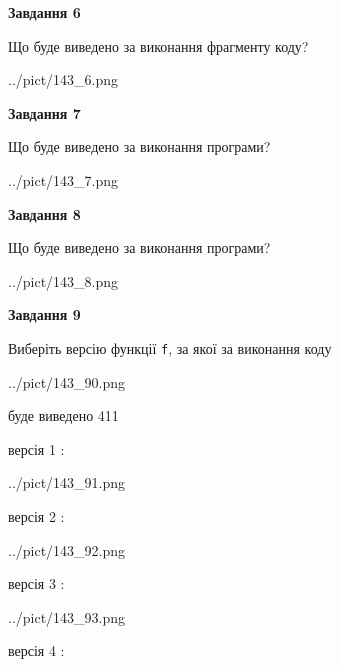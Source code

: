 \documentclass[12pt, ukrainian]{article}
\def\code#1{\Verb!#1!}
\begin{document}
{\begin {large}
{\begin {center}\textbf{Завдання 6}\end {center}}

Що буде виведено за виконання фрагменту коду?\par
\begin{center}
	{../pict/143_6.png}
\end{center}
\newpage

{\begin {center}\textbf{Завдання 7}\end {center}}

Що буде виведено за виконання програми?\par
\begin{center}
	{../pict/143_7.png}
\end{center}
\newpage

{\begin {center}\textbf{Завдання 8}\end {center}}

Що буде виведено за виконання програми?\par
\begin{center}
	{../pict/143_8.png}
\end{center}
\newpage

{\begin {center}\textbf{Завдання 9}\end {center}}

Виберіть версію функції \code{f}, за якої за виконання коду
\begin{center}
	{../pict/143_90.png}
\end{center}
буде виведено 411

\vspace{5mm}
версія 1 :

\begin{center}
	{../pict/143_91.png}
\end{center}
версія 2 :

\begin{center}
	{../pict/143_92.png}
\end{center}
версія 3 :

\begin{center}
	{../pict/143_93.png}
\end{center}
версія 4 :


\end{large}}
\end{document}
